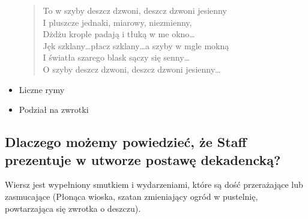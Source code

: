 \documentclass{article}
\begin{document}
\begin{itemize}
\begin{quote}
                To w szyby deszcz dzwoni, deszcz dzwoni jesienny \\
                I pluszcze jednaki, miarowy, niezmienny, \\
                Dżdżu krople padają i tłuką w me okno\dots \\
                Jęk szklany\dots płacz szklany\dots a szyby w mgle mokną \\
                I światła szarego blask sączy się senny\dots \\
                O szyby deszcz dzwoni, deszcz dzwoni jesienny\dots
        \end{quote}
        \item Liczne rymy
        \item Podział na zwrotki
\end{itemize}
\subsection{Dlaczego możemy powiedzieć, że Staff prezentuje w utworze postawę dekadencką?}
Wiersz jest wypełniony smutkiem i wydarzeniami, które są dość przerażające lub zasmucające (Płonąca wioska, szatan zmieniający ogród w pustelnię, powtarzająca się zwrotka o deszczu).
\end{document}
